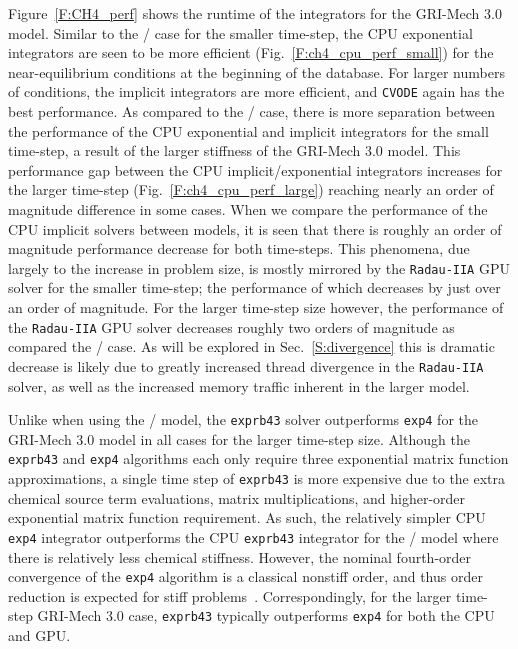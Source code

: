 \documentclass[final,twocolumn]{elsarticle}
\begin{document}
Figure~\ref{F:CH4_perf} shows the runtime of the integrators for the GRI-Mech 3.0 model.
Similar to the \slash{} case for the smaller time-step, the CPU exponential integrators are seen to be more efficient (Fig.~\ref{F:ch4_cpu_perf_small}) for the near-equilibrium conditions at the beginning of the database.
For larger numbers of conditions, the implicit integrators are more efficient, and \texttt{CVODE} again has the best performance.
As compared to the \slash{} case, there is more separation between the performance of the CPU exponential and implicit integrators for the small time-step, a result of the larger stiffness of the GRI-Mech 3.0 model.
This performance gap between the CPU implicit\slash exponential integrators increases for the larger time-step (Fig.~\ref{F:ch4_cpu_perf_large}) reaching nearly an order of magnitude difference in some cases.
When we compare the performance of the CPU implicit solvers between models, it is seen that there is roughly an order of magnitude performance decrease for both time-steps.
This phenomena, due largely to the increase in problem size, is mostly mirrored by the \texttt{Radau-IIA} GPU solver for the smaller time-step; the performance of which decreases by just over an order of magnitude.
For the larger time-step size however, the performance of the \texttt{Radau-IIA} GPU solver decreases roughly two orders of magnitude as compared the \slash{} case.
As will be explored in Sec.~\ref{S:divergence} this is dramatic decrease is likely due to greatly increased thread divergence in the \texttt{Radau-IIA} solver, as well as the increased memory traffic inherent in the larger model.

Unlike when using the \slash{} model, the \texttt{exprb43} solver outperforms \texttt{exp4} for the GRI-Mech 3.0 model in all cases for the larger time-step size.
Although the \texttt{exprb43} and \texttt{exp4} algorithms each only require three exponential matrix function approximations, a single time step of \texttt{exprb43} is more expensive due to the extra chemical source term evaluations, matrix multiplications, and higher-order exponential matrix function requirement.
As such, the relatively simpler CPU \texttt{exp4} integrator outperforms the CPU \texttt{exprb43} integrator for the \slash{} model where there is relatively less chemical stiffness.
However, the nominal fourth-order convergence of the \texttt{exp4} algorithm is a classical nonstiff order, and thus order reduction is expected for stiff problems~\cite{ANU:7701740,Bisetti:2012jw}.
Correspondingly, for the larger time-step GRI-Mech 3.0 case, \texttt{exprb43} typically outperforms \texttt{exp4} for both the CPU and GPU.
\end{document}
